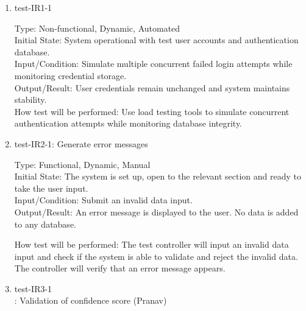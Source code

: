 \documentclass[12pt, titlepage]{article}
\begin{document}
\begin{enumerate}
    \item{test-IR1-1\\}  \label{test-IR1-1}
    
    Type: Non-functional, Dynamic, Automated\\
    
    Initial State: System operational with test user accounts and authentication database.\\
    
    Input/Condition: Simulate multiple concurrent failed login attempts while monitoring credential storage.\\
    
    Output/Result: User credentials remain unchanged and system maintains stability.\\
    
    How test will be performed: Use load testing tools to simulate concurrent authentication attempts while monitoring database integrity.


    \item{test-IR2-1}: Generate error messages \label{test-IR2-1}
    
    Type: Functional, Dynamic, Manual\\
    
    Initial State: The system is set up, open to the relevant section and ready to take the user input.\\
    
    Input/Condition: Submit an invalid data input.\\
    
    Output/Result: An error message is displayed to the user. No data is added to any database. 
    
    How test will be performed: The test controller will input an invalid data input and check if the system is able to validate and reject the invalid data. The controller will verify that an error message appears.


    \item{test-IR3-1\\}: Validation of confidence score (Pranav) \label{test-IR3-1}
    
    
    
    

\end{enumerate}
\end{document}
